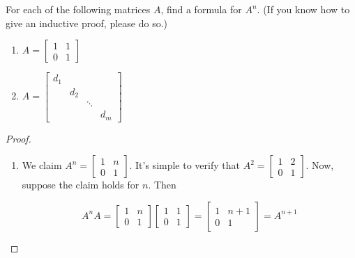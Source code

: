 \begin{exercise} \label{e1.4.11}
    For each of the following matrices \( A \), find a formula for \( A^n \). (If you know how to give an inductive proof, please do so.)
    
    \begin{enumerate}
        \item \( A = \begin{bmatrix} 1 & 1 \\ 0 & 1 \end{bmatrix} \)
        \item \( A = \begin{bmatrix} d_1 & & & \\ & d_2 & & \\ & & \ddots & \\ & & & d_m \end{bmatrix} \)
    \end{enumerate}
    
    \begin{proof}
        \begin{enumerate}
            \item We claim \( A^n = \begin{bmatrix} 1 & n \\ 0 & 1 \end{bmatrix} \). It's simple to verify that \( A^2 = \begin{bmatrix} 1 & 2 \\ 0 & 1 \end{bmatrix} \). Now, suppose the claim holds for \( n \). Then 
            
            \[
                A^n A = \begin{bmatrix} 1 & n \\ 0 & 1 \end{bmatrix} \begin{bmatrix} 1 & 1 \\ 0 & 1 \end{bmatrix} = \begin{bmatrix} 1 & n+1 \\ 0 & 1 \end{bmatrix} = A^{n+1}
            \]
            

\end{enumerate}
\end{proof}
\end{exercise}
